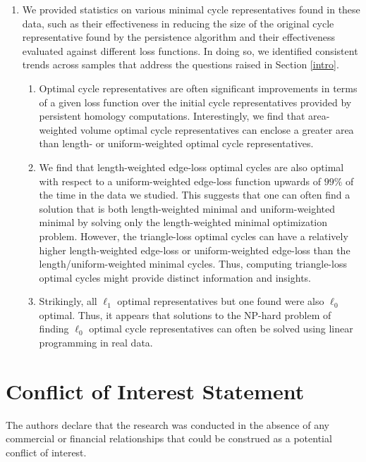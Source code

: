 \documentclass[utf8]{formatting_stuff/frontiersFPHY}
\newcommand{\se}{Section }
\theoremstyle{plain}
\theoremstyle{definition}
\begin{document}
\begin{enumerate}
    \item We provided statistics on various minimal cycle representatives found in these data, such as their effectiveness in reducing the size of the original cycle representative found by the persistence algorithm and their effectiveness evaluated against different loss functions. In doing so, we identified consistent trends across samples that address the questions raised in \se \ref{intro}.
    \begin{enumerate}
        \item Optimal cycle representatives are often significant improvements in terms of a given loss function over the initial cycle representatives provided by persistent homology computations. Interestingly, we find that area-weighted volume optimal cycle representatives can enclose a greater area than length- or uniform-weighted optimal cycle representatives.  
        \item We find that length-weighted edge-loss optimal cycles are also optimal with respect to a uniform-weighted edge-loss function upwards of $99\%$ of the time in the data we studied. This suggests that one can often find a solution that is both length-weighted minimal and uniform-weighted minimal by solving only the length-weighted minimal optimization problem. However, the triangle-loss optimal cycles can have a relatively higher length-weighted edge-loss or uniform-weighted edge-loss than the length/uniform-weighted minimal cycles. Thus, computing triangle-loss optimal cycles might provide distinct information and insights. 
        \item Strikingly, all $\ell_1$ optimal representatives but one found were also $\ell_0$ optimal. Thus, it appears that solutions to the NP-hard problem of finding $\ell_0$ optimal cycle representatives can often be solved using linear programming in real data.
    \end{enumerate}
    


\end{enumerate}

 





\section{Conflict of Interest Statement} 
The authors declare that the research was conducted in the absence of any commercial or financial relationships that could be construed as a potential conflict of interest.
\end{document}
